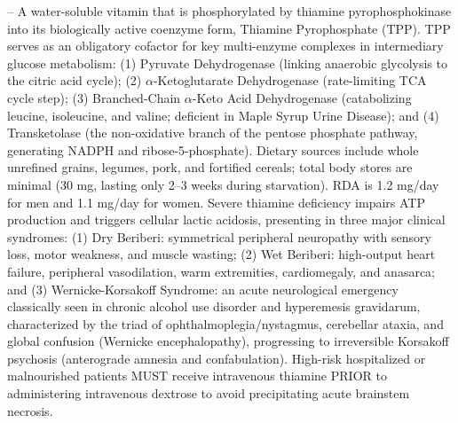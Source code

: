 -- A water-soluble vitamin that is phosphorylated by thiamine pyrophosphokinase into its biologically active coenzyme form, Thiamine Pyrophosphate (TPP). TPP serves as an obligatory cofactor for key multi-enzyme complexes in intermediary glucose metabolism: (1) Pyruvate Dehydrogenase (linking anaerobic glycolysis to the citric acid cycle); (2) $\alpha$-Ketoglutarate Dehydrogenase (rate-limiting TCA cycle step); (3) Branched-Chain $\alpha$-Keto Acid Dehydrogenase (catabolizing leucine, isoleucine, and valine; deficient in Maple Syrup Urine Disease); and (4) Transketolase (the non-oxidative branch of the pentose phosphate pathway, generating NADPH and ribose-5-phosphate). Dietary sources include whole unrefined grains, legumes, pork, and fortified cereals; total body stores are minimal (30 mg, lasting only 2--3 weeks during starvation). RDA is 1.2 mg/day for men and 1.1 mg/day for women. Severe thiamine deficiency impairs ATP production and triggers cellular lactic acidosis, presenting in three major clinical syndromes: (1) Dry Beriberi: symmetrical peripheral neuropathy with sensory loss, motor weakness, and muscle wasting; (2) Wet Beriberi: high-output heart failure, peripheral vasodilation, warm extremities, cardiomegaly, and anasarca; and (3) Wernicke-Korsakoff Syndrome: an acute neurological emergency classically seen in chronic alcohol use disorder and hyperemesis gravidarum, characterized by the triad of ophthalmoplegia/nystagmus, cerebellar ataxia, and global confusion (Wernicke encephalopathy), progressing to irreversible Korsakoff psychosis (anterograde amnesia and confabulation). High-risk hospitalized or malnourished patients MUST receive intravenous thiamine PRIOR to administering intravenous dextrose to avoid precipitating acute brainstem necrosis.

